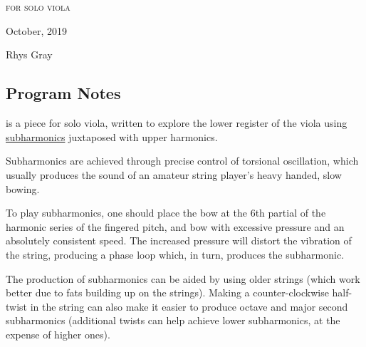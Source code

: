 
\chapter[\violaPiece]{}

\vspace*{3cm}
\begin{center}
\textsc{for solo viola}

\vspace*{3.5cm}

\HRule{0.5pt}


\LARGE \textbf{\uppercase{\violaPiece}}
\HRule{2pt}

\vspace{1.3cm}

\normalsize October, 2019
\date{}

\vspace*{5\baselineskip}

Rhys Gray

\end{center}
\newpage
\newpage

\section*{Program Notes}
\violaPiece\space is a piece for solo viola, written to explore the lower register of the viola using \hyperref[sec:subharmonics]{subharmonics} juxtaposed with upper harmonics. 

Subharmonics are achieved through precise control of torsional oscillation, which usually produces the sound of an amateur string player's heavy handed, slow bowing. 

To play subharmonics, one should place the bow at the 6th partial of the harmonic series of the fingered pitch, and bow with excessive pressure and an absolutely consistent speed. 
The increased pressure will distort the vibration of the string, producing a phase loop which, in turn, produces the subharmonic. 


The production of subharmonics can be aided by using older strings (which work better due to fats building up on the strings). 
Making a counter-clockwise half-twist in the string can also make it easier to produce octave and major second subharmonics (additional twists can help achieve lower subharmonics, at the expense of higher ones).

